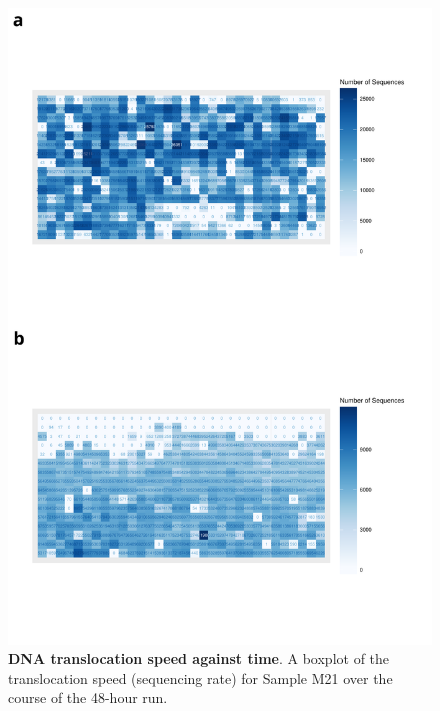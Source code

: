 \begin{figure}[htp]
	\begin{center}
		\includegraphics[page=4,trim={1cm 0cm 0cm 20cm},clip, scale = 0.45]{Figures/ONTWholeTranscriptome.pdf}
	\end{center}
	\captionsetup{width=0.95\textwidth}
	\caption[ONT translocation speed against time from Whole Transcriptome Sequencing]%
	{\textbf{DNA translocation speed against time}. A boxplot of the translocation speed (sequencing rate) for Sample M21 over the course of the 48-hour run. }
	\label{fig:ont_speedvstime}
\end{figure}

